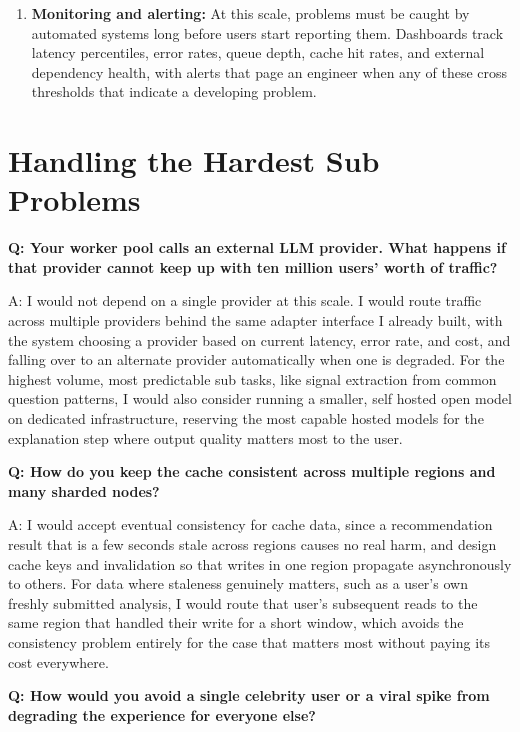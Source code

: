 \documentclass[11pt,a4paper]{report}
\begin{document}
\begin{enumerate}[leftmargin=*]
\item \textbf{Monitoring and alerting:} At this scale, problems must be caught by automated systems long before users start reporting them. Dashboards track latency percentiles, error rates, queue depth, cache hit rates, and external dependency health, with alerts that page an engineer when any of these cross thresholds that indicate a developing problem.
\end{enumerate}

\section{Handling the Hardest Sub Problems}

\begin{qabox}
\textbf{Q: Your worker pool calls an external LLM provider. What happens if that provider cannot keep up with ten million users' worth of traffic?}

A: I would not depend on a single provider at this scale. I would route traffic across multiple providers behind the same adapter interface I already built, with the system choosing a provider based on current latency, error rate, and cost, and falling over to an alternate provider automatically when one is degraded. For the highest volume, most predictable sub tasks, like signal extraction from common question patterns, I would also consider running a smaller, self hosted open model on dedicated infrastructure, reserving the most capable hosted models for the explanation step where output quality matters most to the user.

\textbf{Q: How do you keep the cache consistent across multiple regions and many sharded nodes?}

A: I would accept eventual consistency for cache data, since a recommendation result that is a few seconds stale across regions causes no real harm, and design cache keys and invalidation so that writes in one region propagate asynchronously to others. For data where staleness genuinely matters, such as a user's own freshly submitted analysis, I would route that user's subsequent reads to the same region that handled their write for a short window, which avoids the consistency problem entirely for the case that matters most without paying its cost everywhere.

\textbf{Q: How would you avoid a single celebrity user or a viral spike from degrading the experience for everyone else?}


\end{qabox}
\end{document}
